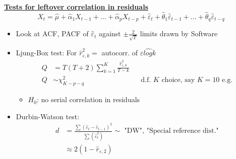 \textbf{\underline{Tests for leftover correlation in residuals}}
\[
X_t=\hat{\mu} +\hat{\alpha}_1X_{t-1}+...+\hat{\alpha}_p X_{t-p}+\hat{\varepsilon}_t +\hat{\theta}_1\hat{\varepsilon}_{t-1}+...+\hat{\theta}_q \hat{\varepsilon}_{t-q}
\]
\begin{itemize}
    \item Look at ACF, PACF of $\hat{\varepsilon}_t$ against $\pm \frac{2}{\sqrt{T}}$ limits drawn by Software
    \item Ljung-Box test: For $\hat{r}_{\varepsilon,k}^2=$ autocorr. of $\hat{\varepsilon log k}$
    \begin{align*}
        Q&=T(T+2) \sum_{k=1}^K \frac{\hat{r}_{\varepsilon,k}^2}{T-k}\\
        Q &\sim \chi^2_{K-p-q} &&\text{d.f. $K$ choice, say $K=10$ e.g.}
    \end{align*}
    \begin{itemize}
        \item[] $H_0$: no serial correlation in residuals
    \end{itemize}
    \item Durbin-Watson test:
    \begin{align*}
        d&=\frac{\sum(\hat{\varepsilon}_t-\hat{\varepsilon}_{t-1})^2}{\sum (\hat{\varepsilon}_t^2)} \sim \text{ "DW", "Special reference dist."} \\
        &\approx 2(1-\hat{r}_{\varepsilon,2})
    \end{align*}
\end{itemize}

